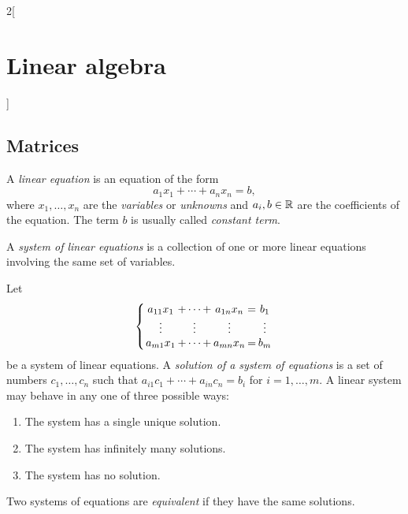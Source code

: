 \documentclass[../../../main.tex]{subfiles}
\begin{document}
\begin{multicols}{2}[\section{Linear algebra}]
\subsection{Matrices}
\begin{definition}
    A \textit{linear equation} is an equation of the form $$a_1x_1+\cdots+a_nx_n=b,$$ where $x_1,\ldots,x_n$ are the \textit{variables} or \textit{unknowns} and $a_i,b\in\mathbb{R}$ are the coefficients of the equation. The term $b$ is usually called \textit{constant term}.
\end{definition}
\begin{definition}
    A \textit{system of linear equations} is a collection of one or more linear equations involving the same set of variables.
\end{definition}
\begin{definition}
    Let
    \begin{equation*}
        \arraycolsep=1pt
        \left\{
        \begin{array}{ccccc}
            a_{11}x_1 & + \cdots + & a_{1n}x_n & = & b_1\\
            \vdots & \vdots & \vdots & & \vdots\\
            a_{m1}x_1 & + \cdots + & a_{mn}x_n & = & b_m
        \end{array}
        \right.
    \end{equation*}
    be a system of linear equations. A \textit{solution of a system of equations} is a set of numbers $c_1,\ldots,c_n$ such that $a_{i1}c_1+\cdots+a_{in}c_n=b_i$ for $i=1,\ldots,m$. A linear system may behave in any one of three possible ways:
    \begin{enumerate}
        \item The system has a single unique solution. 
        \item The system has infinitely many solutions.
        \item The system has no solution.
    \end{enumerate}
\end{definition}
\begin{definition}
    Two systems of equations are \textit{equivalent} if they have the same solutions.
\end{definition}
\begin{definition}[Matrix]

\end{definition}
\end{multicols}
\end{document}
